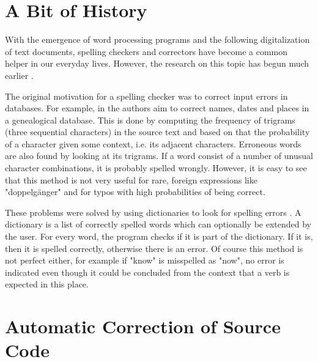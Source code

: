 \section{A Bit of History}

With the emergence of word processing programs and the following digitalization of text documents, spelling checkers and correctors have become a common helper in our everyday lives. However, the research on this topic has begun much earlier \cite{program_check_correction}.

The original motivation for a spelling checker was to correct input errors in databases. For example, in \cite{data_correction} the authors aim to correct names, dates and places in a genealogical database. This is done by computing the frequency of trigrams (three sequential characters) in the source text and based on that the probability of a character given some context, i.e. its adjacent characters. Erroneous words are also found by looking at its trigrams. If a word consist of a number of unusual character combinations, it is probably spelled wrongly. However, it is easy to see that this method is not very useful for rare, foreign expressions like "doppelg\"{a}nger" and for typos with high probabilities of being correct.

These problems were solved by using dictionaries to look for spelling errors \cite{program_check_correction}. A dictionary is a list of correctly spelled words which can optionally be extended by the user. For every word, the program checks if it is part of the dictionary. If it is, then it is spelled correctly, otherwise there is an error. Of course this method is not perfect either, for example if "know" is misspelled as "now", no error is indicated even though it could be concluded from the context that a verb is expected in this place.

\section{Automatic Correction of Source Code}
